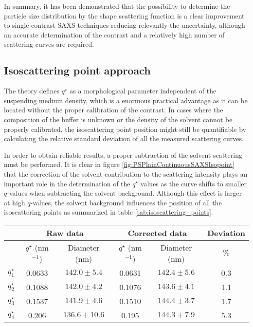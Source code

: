 In summary, it has been demonstrated that the possibility to determine the particle size distribution by the shape scattering function is a clear improvement to single-contrast SAXS techniques reducing relevantly the uncertainty, although an accurate determination of the contrast and a relatively high number of scattering curves are required. 

\subsection{Isoscattering point approach}

The theory defines $q^{\star}$ as a morphological parameter independent of the suspending medium density, which is a enormous practical advantage as it can be located without the proper calibration of the contrast. In cases where the composition of the buffer is unknown or the density of the solvent cannot be properly calibrated, the isoscattering point position might still be quantifiable by calculating the relative standard deviation of all the measured scattering curves. 

In order to obtain reliable results, a proper subtraction of the solvent scattering must be performed. It is clear in figure \ref{fig:PSPlainContinuousSAXSIsopoint} that the correction of the solvent contribution to the scattering intensity plays an important role in the determination of the $q^{\star}$ values as the curve shifts to smaller $q$-values when subtracting the solvent background. Although this effect is larger at high $q$-values, the solvent background influences the position of all the isoscattering points as summarized in table \ref{tab:isoscattering_points}. 

\begin{table*}
	\centering
	\begin{tabular}{l||cc|cc|c}
		 & \multicolumn{2}{c}{Raw data} & \multicolumn{2}{c}{Corrected data} & Deviation\\
		 \hline
		 & \( q^{\star} \) (nm\(^{-1}\))    &  Diameter (nm) & \( q^{\star}\) (nm\(^{-1}\))    &  Diameter (nm) & $\%$ \\
		\hline
		 \(q^{\star}_1\) &  0.0633 & $142.0\pm5.4$ &  0.0631 & $142.4\pm5.6$ & 0.3 \\
		 \(q^{\star}_2\) &  0.1088 & $142.0\pm4.2$ &  0.1076 & $143.6\pm4.1$ & 1.1   \\
		 \(q^{\star}_3\) &  0.1537 & $141.9\pm4.6$ &  0.1510 & $144.4\pm3.7$ & 1.7    \\
		 \(q^{\star}_4\) &  0.206  & $136.6\pm10.6$ &  0.195  & $144.3\pm7.9$ & 5.3     \\
		\end{tabular}
	\caption[Isoscattering points position and their corresponding particle diameter.]{Isoscattering points position and the corresponding particle diameter for the scattering curves before and after background correction. The diameter deviation between both values is also shown, with larger deviation for higher $q$-values. \textcolor{red}{The associated uncertainty is calculated from the relative standard deviation from the plot BLABLA, with on interval of confidence.}}
	\label{tab:isoscattering_points}
\end{table*}

